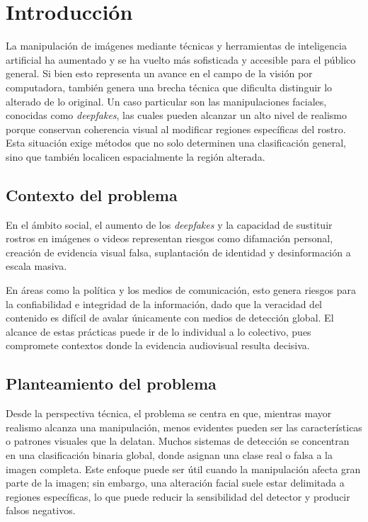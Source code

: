 \section{Introducción}


La manipulación de imágenes mediante técnicas y herramientas de inteligencia artificial ha aumentado y se ha vuelto más sofisticada y accesible para el público general. Si bien esto representa un avance en el campo de la visión por computadora, también genera una brecha técnica que dificulta distinguir lo alterado de lo original. Un caso particular son las manipulaciones faciales, conocidas como \textit{deepfakes}, las cuales pueden alcanzar un alto nivel de realismo porque conservan coherencia visual al modificar regiones específicas del rostro. Esta situación exige métodos que no solo determinen una clasificación general, sino que también localicen espacialmente la región alterada.
\subsection{Contexto del problema}

En el ámbito social, el aumento de los \textit{deepfakes} y la capacidad de sustituir rostros en imágenes o videos representan riesgos como difamación personal, creación de evidencia visual falsa, suplantación de identidad y desinformación a escala masiva.

En áreas como la política y los medios de comunicación, esto genera riesgos para la confiabilidad e integridad de la información, dado que la veracidad del contenido es difícil de avalar únicamente con medios de detección global. El alcance de estas prácticas puede ir de lo individual a lo colectivo, pues compromete contextos donde la evidencia audiovisual resulta decisiva.

\subsection{Planteamiento del problema}

Desde la perspectiva técnica, el problema se centra en que, mientras mayor realismo alcanza una manipulación, menos evidentes pueden ser las características o patrones visuales que la delatan. Muchos sistemas de detección se concentran en una clasificación binaria global, donde asignan una clase real o falsa a la imagen completa. Este enfoque puede ser útil cuando la manipulación afecta gran parte de la imagen; sin embargo, una alteración facial suele estar delimitada a regiones específicas, lo que puede reducir la sensibilidad del detector y producir falsos negativos.


